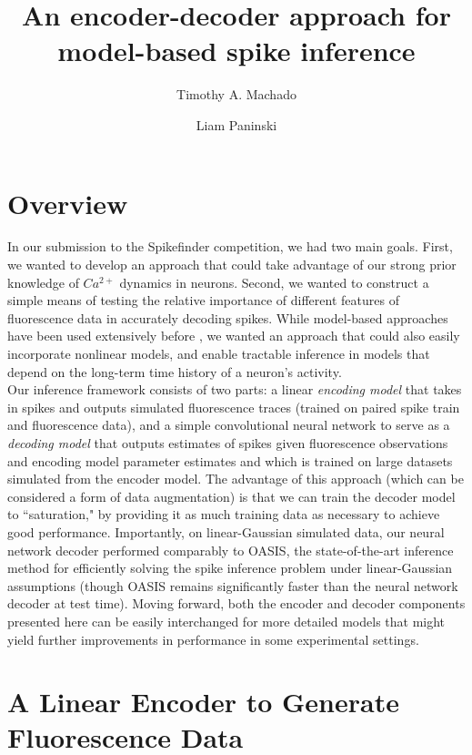\documentclass[fleqn,10pt]{wlscirep}
\title{An encoder-decoder approach for model-based spike inference}
\author[1,*,+]{Timothy A. Machado}
\author[1]{Liam Paninski}
\affil[1]{Department of Statistics and Grossman Center for the Statistics of Mind, New York, NY, USA}
\affil[+]{Current affiliation: Department of Bioengineering, Stanford University, Stanford, CA, USA}
\affil[*]{tim.machado@gmail.com}
\begin{document}
\maketitle

\section{Overview}

In our submission to the Spikefinder competition, we had two main goals. First, we wanted to develop an approach that could take advantage of our strong prior knowledge of $Ca^{2+}$ dynamics in neurons. Second, we wanted to construct a simple means of testing the relative importance of different features of fluorescence data in accurately decoding spikes. While model-based approaches have been used extensively before \cite{oopsi, eftychios, oasis}, we wanted an approach that could also easily incorporate nonlinear models, and enable tractable inference in models that depend on the long-term time history of a neuron's activity. \\

Our inference framework consists of two parts: a linear \emph{encoding model} that takes in spikes and outputs simulated fluorescence traces (trained on paired spike train and fluorescence data), and a simple convolutional neural network to serve as a \emph{decoding model} that outputs estimates of spikes given fluorescence observations and encoding model parameter estimates and which is trained on large datasets simulated from the encoder model. The advantage of this approach (which can be considered a form of data augmentation) is that we can train the decoder model to ``saturation," by providing it as much training data as necessary to achieve good performance.  Importantly, on linear-Gaussian simulated data, our neural network decoder performed comparably to OASIS\cite{oasis}, the state-of-the-art inference method for efficiently solving the spike inference problem under linear-Gaussian assumptions (though OASIS remains significantly faster than the neural network decoder at test time). Moving forward, both the encoder and decoder components presented here can be easily interchanged for more detailed models that might yield further improvements in performance in some experimental settings.

\section{A Linear Encoder to Generate Fluorescence Data}
\end{document}
